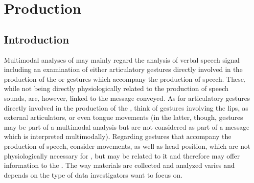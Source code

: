 \documentclass[output=paper]{langsci/langscibook}
\begin{document}
\section{Production} \label{sec:gil:2}
\subsection{Introduction} \label{sec:gil:2:1}
Multimodal analyses of  may mainly regard the analysis of verbal speech signal including an examination of either articulatory gestures directly involved in the production of the  or gestures which accompany the production of speech. These, while  not being directly physiologically related to the production of speech sounds, are, however, linked to the message conveyed. As for articulatory gestures directly involved in the production of the , think of gestures involving the lips, as external articulators, or even tongue movements (in the latter, though, gestures may be part of a multimodal analysis but are not considered as part of a message which is interpreted multimodally). Regarding gestures that accompany the production of speech, consider  movements, as well as head position, which are not physiologically necessary for , but may be related to it and therefore may offer information to the . The way materials are collected and analyzed varies and depends on the type of data investigators want to focus on.\largerpage
\end{document}
